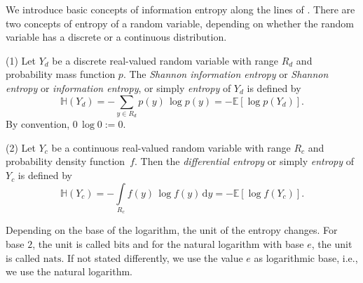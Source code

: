 \documentclass[smallextended]{svjour3}
\newcommand{\E}{\mathbb{E}}
\renewcommand{\H}{\mathbb{H}}
\newcommand{\Poi}{\operatorname{Poi}}
\newcommand{\suml}{\sum\limits}
\newcommand{\intl}{\int\limits}
\newcommand{\dd}[1]{\,\mathrm{d}#1}
\newcommand{\bits}{\mathrm{bits}}
\newcommand{\nats}{\mathrm{nats}}
\newcommand{\ie}{i.e.}
\newcommand{\pdf}{probability density function}
\begin{document}

We introduce basic concepts of information entropy along the lines of \citet{Cover2006}.
There are two concepts of entropy of a random variable, depending on whether the random variable has a discrete or a continuous distribution.
\begin{definition}%
\label{def:discrete_entropy}
	(1) Let $Y_d$ be a discrete real-valued random variable with range $R_d$ and probability mass function $p$.
	The \emph{Shannon information entropy} or \emph{Shannon entropy} or \emph{information entropy}, or simply \emph{entropy} of $Y_d$ is defined by
	\begin{equation*}
		\H(Y_d) = -\suml_{y\in R_d} p(y)\,\log p(y) = -\E\left[\log p(Y_d)\right].
	\end{equation*}
	By convention, $0\,\log 0:=0$.
	
	(2) Let $Y_c$ be a continuous real-valued random variable with range $R_c$ and \pdf\ $f$.
	Then the \emph{differential entropy} or simply \emph{entropy} of $Y_c$ is defined by
	\begin{equation*}
		\H(Y_c) = -\intl_{R_c} f(y)\,\log f(y)\dd{y} = -\E\left[\log f(Y_c)\right].
	\end{equation*}
\end{definition}

\begin{remark}
	Depending on the base of the logarithm, the unit of the entropy changes.
	For base $2$, the unit is called \emph{$\bits$} and for the natural logarithm with base $e$, the unit is called \emph{$\nats$}.
	If not stated differently, we use the value $e$ as logarithmic base, \ie, we use the natural logarithm.
\end{remark}
\end{document}
